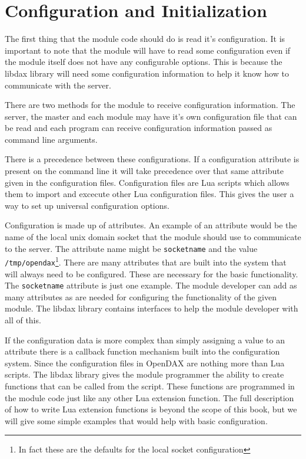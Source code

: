 \chapter{Configuration and Initialization}

The first thing that the module code should do is read it's configuration.  It
is important to note that the module will have to read some configuration even
if the module itself does not have any configurable options. This is because the
libdax library will need some configuration information to help it know how to
communicate with the server.

There are two methods for the module to receive configuration information.
The server, the master and each module may have it's own configuration file that can be read and
each program can receive configuration information passed as command line
arguments.

There is a precedence between these configurations.  If a configuration
attribute is present on the command line it will take precedence over that same
attribute given in the configuration files.  Configuration files are Lua scripts
which allows them to import and excecute other Lua configuration files.  This
gives the user a way to set up universal configuration options.

Configuration is made up of attributes.  An example of an attribute would be the
name of the local unix domain socket that the module should use to communicate
to the server.  The attribute name might be \texttt{socketname} and the value
\texttt{/tmp/opendax}\footnote{In fact these are the defaults for the local
socket configuration}.  There are many attributes that are built into the system
that will always need to be configured.  These are necessary for the basic
functionality.  The \texttt{socketname} attribute is just one example.  The
module developer can add as many attributes as are needed for configuring the
functionality of the given module.  The libdax library contains interfaces to
help the module developer with all of this.

If the configuration data is more complex than simply assigning a value to an
attribute there is a callback function mechanism built into the configuration
system.  Since the configuration files in OpenDAX are nothing more than Lua scripts.
The libdax library gives the module programmer the ability to create functions
that can be called from the script.  These functions are programmed in the
module code just like any other Lua extension function.  The full description of
how to write Lua extension functions is beyond the scope of this book, but we
will give some simple examples that would help with basic configuration.

